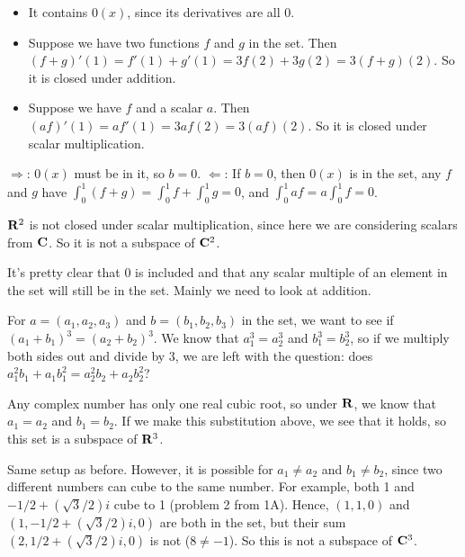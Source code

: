 \documentclass{article}
\begin{document}

\begin{itemize}
\item It contains $0(x)$, since its derivatives are all 0.
\item Suppose we have two functions $f$ and $g$ in the set. Then $(f+g)'(1) =
  f'(1) + g'(1) = 3f(2) + 3g(2) = 3(f+g)(2)$. So it is closed under addition.
\item Suppose we have $f$ and a scalar $a$. Then $(af)'(1) = af'(1) = 3af(2) =
  3(af)(2)$. So it is closed under scalar multiplication.
\end{itemize}


$\Rightarrow$: $0(x)$ must be in it, so $b = 0$. $\Leftarrow$: If $b = 0$, then
$0(x)$ is in the set, any $f$ and $g$ have $\int_0^1 (f+g) = \int_0^1 f +
\int_0^1 g = 0$, and $\int_0^1 af = a \int_0^1 f = 0$.


$\mathbf{R}^2$ is not closed under scalar multiplication, since here we are
considering scalars from $\mathbf{C}$. So it is not a subspace of $\mathbf{C}^2$.


It's pretty clear that 0 is included and that any scalar multiple of an element
in the set will still be in the set. Mainly we need to look at addition.

For $a = (a_1, a_2, a_3)$ and $b = (b_1, b_2, b_3)$ in the set, we want to see
if $(a_1 + b_1)^3 = (a_2 + b_2)^3$. We know that $a_1^3 = a_2^3$ and $b_1^3 =
b_2^3$, so if we multiply both sides out and divide by 3, we are left with the
question: does $a_1^2b_1 + a_1b_1^2 = a_2^2b_2 + a_2b_2^2$?

Any complex number has only one real cubic root, so under $\mathbf{R}$, we know that
$a_1 = a_2$ and $b_1 = b_2$. If we make this substitution above, we see that it
holds, so this set is a subspace of $\mathbf{R}^3$.


Same setup as before. However, it is possible for $a_1 \neq a_2$ and $b_1 \neq
b_2$, since two different numbers can cube to the same number. For example, both
1 and $-1/2 + (\sqrt{3}/2)i$ cube to 1 (problem 2 from 1A). Hence, $(1, 1, 0)$ and
$(1, -1/2 + (\sqrt{3}/2)i, 0)$ are both in the set, but their sum $(2, 1/2 +
(\sqrt{3}/2)i, 0)$ is not ($8 \neq -1$). So this is not a subspace of
$\mathbf{C}^3$.

\end{document}
